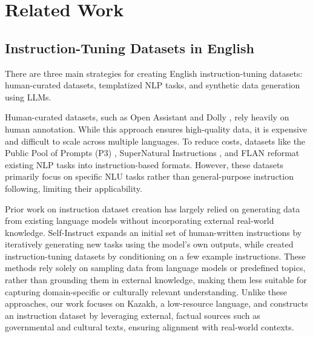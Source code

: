 \section{Related Work}
\subsection{Instruction-Tuning Datasets in English}


There are three main strategies for creating English instruction-tuning datasets: human-curated datasets, templatized NLP tasks, and synthetic data generation using LLMs.

Human-curated datasets, such as Open Assistant \cite{kopf2023openassistant} and Dolly \cite{conover2023dolly}, rely heavily on human annotation. While this approach ensures high-quality data, it is expensive and difficult to scale across multiple languages. To reduce costs, datasets like the Public Pool of Prompts (P3) \cite{sanh2021multitask}, SuperNatural Instructions \cite{wang2022super}, and FLAN \cite{longpre2023flan} reformat existing NLP tasks into instruction-based formats. However, these datasets primarily focus on specific NLU tasks rather than general-purpose instruction following, limiting their applicability.

Prior work on instruction dataset creation has largely relied on generating data from existing language models without incorporating external real-world knowledge. Self-Instruct \cite{wang2023self} expands an initial set of human-written instructions by iteratively generating new tasks using the model’s own outputs, while \citet{honovich2022unnatural} created instruction-tuning datasets by conditioning on a few example instructions. These methods rely solely on sampling data from language models or predefined topics, rather than grounding them in external knowledge, making them less suitable for capturing domain-specific or culturally relevant understanding. Unlike these approaches, our work focuses on Kazakh, a low-resource language, and constructs an instruction dataset by leveraging external, factual sources such as governmental and cultural texts, ensuring alignment with real-world contexts.

